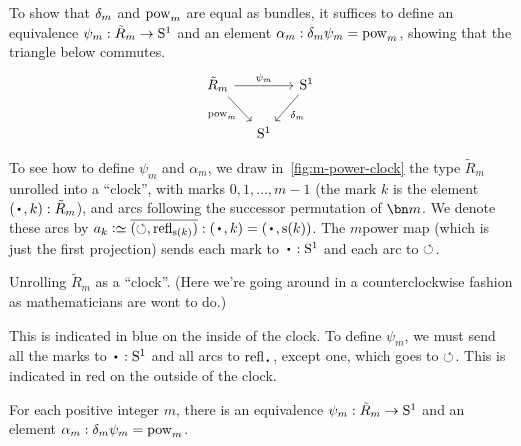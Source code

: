 To show that $\delta_{m}$ and $\pow{m}$ are equal as bundles,
it suffices to define an equivalence $\psi_m : \tilde R_m \to {\mathrm{S}^1}$
and an element $\alpha_m : \dg{m}\psi_m = \pow{m}$,
showing that the triangle below commutes.
\[
  \begin{tikzcd}[column sep=small,ampersand replacement=\&]
    \tilde R_m \ar[rr,"\psi_m"]\ar[dr,"\pow{m}"'] \& \& \Sc\ar[dl,"\dg{m}"] \\
    \& \Sc \&
  \end{tikzcd}
\]

To see how to define $\psi_m$ and $\alpha_m$,
we draw in~\cref{fig:m-power-clock} the type $\tilde R_m$
unrolled into a ``clock'', with marks $0,1,\dots,m-1$
(the mark $k$ is the element $(\base,k):\tilde R_m$),
and arcs following the successor permutation of $\bn m$.
We denote these arcs by $a_k \defeq \pathpair{\Sloop}{\refl{\zs(k)}} : (\base,k) = (\base,\zs(k))$.
The $m$\th power map (which is just the first projection)
sends each mark to $\base:\Sc$ and each arc to $\circlearrowleft$.
\begin{marginfigure}
  \caption{Unrolling $\tilde R_m$ as a ``clock''. (Here we're going around in a counterclockwise fashion as mathematicians are wont to do.)}
  \label{fig:m-power-clock}
\end{marginfigure}
This is indicated in blue on the inside of the clock.
To define $\psi_m$, we must send all the marks to $\base:\Sc$
and all arcs to $\refl\base$, except one, which goes to $\circlearrowleft$.
This is indicated in red on the outside of the clock.
\begin{construction}\label{con:psi-alpha-m}
  For each positive integer $m$,
  there is an equivalence $\psi_m : \tilde R_m \to {\mathrm{S}^1}$
  and an element $\alpha_m : \dg{m}\psi_m = \pow{m}$.
\end{construction}
